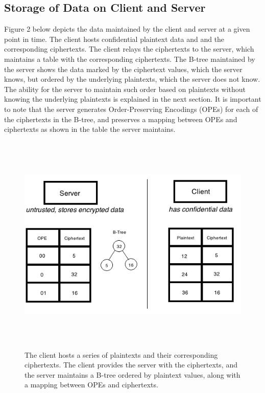 \documentclass[12pt]{article}
\begin{document}
\subsection{Storage of Data on Client and Server}
Figure 2 below depicts the data maintained by the client and server at a given point in time. The client hosts confidential plaintext data and and the corresponding ciphertexts. The client relays the ciphertexts to the server, which maintains a table with the corresponding ciphertexts. The B-tree maintained by the server shows the data marked by the ciphertext values, which the server knows, but ordered by the underlying plaintexts, which the server does not know. The ability for the server to maintain such order based on plaintexts without knowing the underlying plaintexts is explained in the next section. It is important to note that the server generates Order-Preserving Encodings (OPEs) for each of the ciphertexts in the B-tree, and preserves a mapping between OPEs and ciphertexts as shown in the table the server maintains.
\begin{figure}[htb]
\begin{center}
\includegraphics[height=4.2in,width=6in,angle=0]{857pic6.png}
\caption{The client hosts a series of plaintexts and their corresponding ciphertexts. The client provides the server with the ciphertexts, and the server maintains a B-tree ordered by plaintext values, along with a mapping between OPEs and ciphertexts.}
\end{center}
\end{figure}
\end{document}
